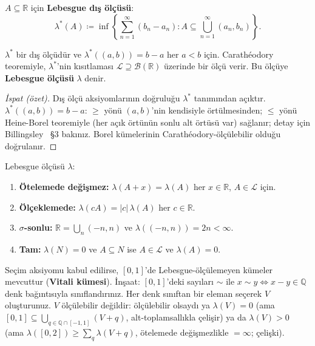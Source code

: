 \begin{tanim}\label{def:lebesgue_dis}
$A \subseteq \mathbb{R}$ için \textbf{Lebesgue dış ölçüsü}:
\[
  \lambda^*(A) \coloneqq \inf\left\{
    \sum_{n=1}^\infty (b_n - a_n) :
    A \subseteq \bigcup_{n=1}^\infty (a_n, b_n)
  \right\}.
\]
\end{tanim}

\begin{teorem}\label{thm:lebesgue_varlik}
$\lambda^*$ bir dış ölçüdür ve $\lambda^*((a,b)) = b - a$ her $a < b$ için.
Carathéodory teoremiyle, $\lambda^*$'nin kısıtlaması
$\mathcal{L} \supseteq \mathcal{B}(\mathbb{R})$ üzerinde bir ölçü verir.
Bu ölçüye \textbf{Lebesgue ölçüsü} $\lambda$ denir.
\end{teorem}

\begin{proof}[İspat (özet)]
Dış ölçü aksiyomlarının doğruluğu $\lambda^*$ tanımından açıktır.
$\lambda^*((a,b)) = b-a$: $\geq$ yönü $(a,b)$'nin kendisiyle örtülmesinden;
$\leq$ yönü Heine-Borel teoremiyle (her açık örtünün sonlu alt örtüsü var)
sağlanır; detay için Billingsley~\cite{billingsley1995} §3 bakınız.
Borel kümelerinin Carathéodory-ölçülebilir olduğu doğrulanır.
\end{proof}

\begin{onerme}\label{prop:lebesgueozell}
Lebesgue ölçüsü $\lambda$:
\begin{enumerate}[label=(\roman*)]
  \item \textbf{Ötelemede değişmez:} $\lambda(A + x) = \lambda(A)$ her $x \in \mathbb{R}$,
        $A \in \mathcal{L}$ için.
  \item \textbf{Ölçeklemede:} $\lambda(cA) = |c|\,\lambda(A)$ her $c \in \mathbb{R}$.
  \item \textbf{$\sigma$-sonlu:} $\mathbb{R} = \bigcup_n (-n,n)$ ve $\lambda((-n,n)) = 2n < \infty$.
  \item \textbf{Tam:} $\lambda(N) = 0$ ve $A \subseteq N$ ise $A \in \mathcal{L}$ ve $\lambda(A) = 0$.
\end{enumerate}
\end{onerme}

\begin{karsiornek}
Seçim aksiyomu kabul edilirse, $[0,1]$'de Lebesgue-ölçülemeyen kümeler
mevcuttur (\textbf{Vitali kümesi}). İnşaat: $[0,1]$'deki sayıları
$\sim$ ile $x \sim y \iff x - y \in \mathbb{Q}$ denk bağıntısıyla sınıflandırınız.
Her denk sınıftan bir eleman seçerek $V$ oluşturunuz. $V$ ölçülebilir değildir:
ölçülebilir olsaydı ya $\lambda(V) = 0$ (ama $[0,1] \subseteq \bigcup_{q \in \mathbb{Q} \cap [-1,1]} (V+q)$,
alt-toplamsallıkla çelişir) ya da $\lambda(V) > 0$ (ama $\lambda([0,2]) \geq \sum_{q} \lambda(V+q)$,
ötelemede değişmezlikle $= \infty$; çelişki).
\end{karsiornek}

